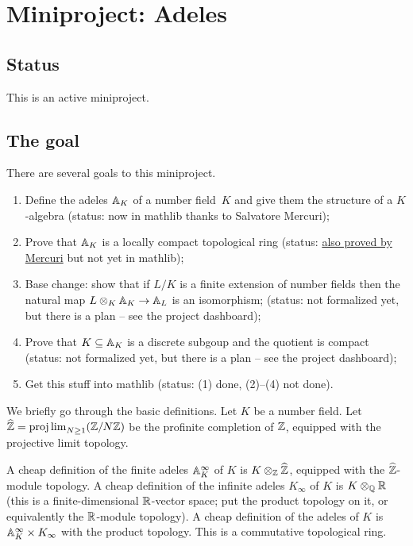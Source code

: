 \chapter{Miniproject: Adeles}\label{Adele_miniproject}

\section{Status}

This is an active miniproject.

\section{The goal}

There are several goals to this miniproject.

\begin{enumerate}
  \item Define the adeles $\mathbb{A}_K$ of a number field~$K$ and
    give them the structure of a $K$-algebra (status: now in mathlib thanks to
    Salvatore Mercuri);
  \item Prove that $\mathbb{A}_K$ is a locally compact topological ring (status:
      \href{https://github.com/smmercuri/adele-ring_locally-compact}{
      also proved by Mercuri} but not yet in mathlib);
  \item Base change: show that if $L/K$ is a finite extension of number fields then the
    natural map $L\otimes_K\mathbb{A}_K\to\mathbb{A}_L$ is an isomorphism; (status: not
    formalized yet, but there is a plan -- see the project dashboard);
  \item Prove that $K \subseteq \mathbb{A}_K$ is a discrete subgoup and the quotient
    is compact (status: not formalized yet, but there is a plan -- see the project
    dashboard);
  \item Get this stuff into mathlib (status: (1) done, (2)--(4) not done).
\end{enumerate}

We briefly go through the basic definitions. Let $K$ be a number field.
Let $\widehat{\mathbb{Z}}=\projlim_{N\geq1}(\mathbb{Z}/N\mathbb{Z})$ be the profinite completion of $\mathbb{Z}$,
equipped with the projective limit topology.

A cheap definition of the finite adeles $\mathbb{A}_K^\infty$ of $K$ is $K\otimes_{\mathbb{Z}}\widehat{\mathbb{Z}}$,
equipped with the $\widehat{\mathbb{Z}}$-module topology.
A cheap definition of the infinite adeles
$K_\infty$ of $K$ is $K\otimes_{\mathbb{Q}}\mathbb{R}$ (this is a finite-dimensional $\mathbb{R}$-vector space;
put the product topology on it, or equivalently the $\mathbb{R}$-module topology).
A cheap definition of the adeles of $K$ is $\mathbb{A}_K^\infty\times K_\infty$ with
the product topology. This is a commutative topological ring.


